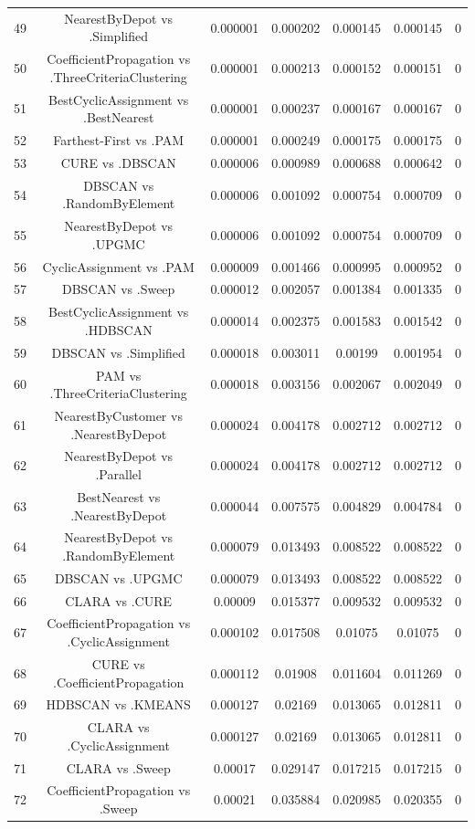 \documentclass[a4paper,10pt]{article}
\begin{document}
\begin{landscape}
\begin{table}[!htp]
\begin{tabular}{ccccccc}
49&NearestByDepot vs .Simplified&0.000001&0.000202&0.000145&0.000145&0\\
50&CoefficientPropagation vs .ThreeCriteriaClustering&0.000001&0.000213&0.000152&0.000151&0\\
51&BestCyclicAssignment vs .BestNearest&0.000001&0.000237&0.000167&0.000167&0\\
52&Farthest-First vs .PAM&0.000001&0.000249&0.000175&0.000175&0\\
53&CURE vs .DBSCAN&0.000006&0.000989&0.000688&0.000642&0\\
54&DBSCAN vs .RandomByElement&0.000006&0.001092&0.000754&0.000709&0\\
55&NearestByDepot vs .UPGMC&0.000006&0.001092&0.000754&0.000709&0\\
56&CyclicAssignment vs .PAM&0.000009&0.001466&0.000995&0.000952&0\\
57&DBSCAN vs .Sweep&0.000012&0.002057&0.001384&0.001335&0\\
58&BestCyclicAssignment vs .HDBSCAN&0.000014&0.002375&0.001583&0.001542&0\\
59&DBSCAN vs .Simplified&0.000018&0.003011&0.00199&0.001954&0\\
60&PAM vs .ThreeCriteriaClustering&0.000018&0.003156&0.002067&0.002049&0\\
61&NearestByCustomer vs .NearestByDepot&0.000024&0.004178&0.002712&0.002712&0\\
62&NearestByDepot vs .Parallel&0.000024&0.004178&0.002712&0.002712&0\\
63&BestNearest vs .NearestByDepot&0.000044&0.007575&0.004829&0.004784&0\\
64&NearestByDepot vs .RandomByElement&0.000079&0.013493&0.008522&0.008522&0\\
65&DBSCAN vs .UPGMC&0.000079&0.013493&0.008522&0.008522&0\\
66&CLARA vs .CURE&0.00009&0.015377&0.009532&0.009532&0\\
67&CoefficientPropagation vs .CyclicAssignment&0.000102&0.017508&0.01075&0.01075&0\\
68&CURE vs .CoefficientPropagation&0.000112&0.01908&0.011604&0.011269&0\\
69&HDBSCAN vs .KMEANS&0.000127&0.02169&0.013065&0.012811&0\\
70&CLARA vs .CyclicAssignment&0.000127&0.02169&0.013065&0.012811&0\\
71&CLARA vs .Sweep&0.00017&0.029147&0.017215&0.017215&0\\
72&CoefficientPropagation vs .Sweep&0.00021&0.035884&0.020985&0.020355&0\\

\end{tabular}
\end{table}
\end{landscape}
\end{document}
